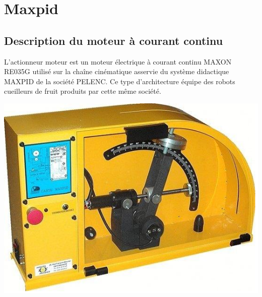 

\section{Maxpid}

\subsection{Description du moteur à courant continu}

\begin{minipage}{0.6\linewidth}
L'actionneur moteur est un moteur électrique à courant continu MAXON RE035G utilisé sur la chaîne cinématique asservie du système didactique MAXPID de la société PELENC. Ce type d'architecture équipe des robots cueilleurs de fruit produits par cette même société.
\end{minipage}
 \hfill
\begin{minipage}{0.35\linewidth}
 \centering\includegraphics[width=0.8\linewidth]{img/Maxpid.png}
\end{minipage}

